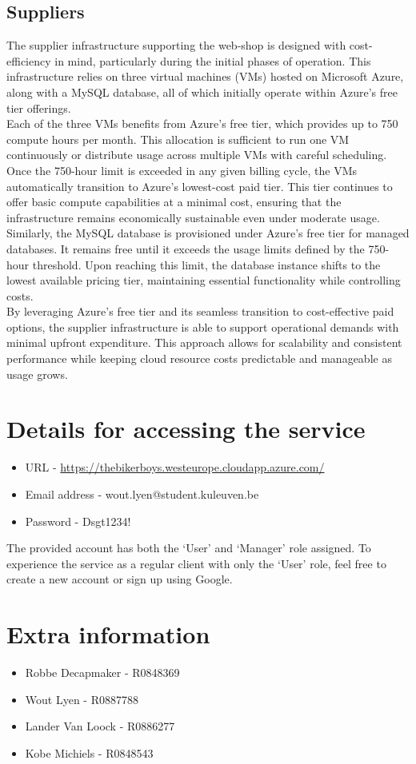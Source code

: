 \documentclass[10pt,a4paper,kul]{kulakarticle} %
\begin{document}
		\subsection{Suppliers}
			The supplier infrastructure supporting the web-shop is designed with cost-efficiency in mind, particularly during the initial phases of operation. This infrastructure relies on three virtual machines (VMs) hosted on Microsoft Azure, along with a MySQL database, all of which initially operate within Azure's free tier offerings.\\
			Each of the three VMs benefits from Azure’s free tier, which provides up to 750 compute hours per month. This allocation is sufficient to run one VM continuously or distribute usage across multiple VMs with careful scheduling. Once the 750-hour limit is exceeded in any given billing cycle, the VMs automatically transition to Azure’s lowest-cost paid tier. This tier continues to offer basic compute capabilities at a minimal cost, ensuring that the infrastructure remains economically sustainable even under moderate usage.\\
			Similarly, the MySQL database is provisioned under Azure’s free tier for managed databases. It remains free until it exceeds the usage limits defined by the 750-hour threshold. Upon reaching this limit, the database instance shifts to the lowest available pricing tier, maintaining essential functionality while controlling costs.\\
			By leveraging Azure’s free tier and its seamless transition to cost-effective paid options, the supplier infrastructure is able to support operational demands with minimal upfront expenditure. This approach allows for scalability and consistent performance while keeping cloud resource costs predictable and manageable as usage grows.
			
	\section{Details for accessing the service}
	
	\begin{itemize}
		\item URL - \url{https://thebikerboys.westeurope.cloudapp.azure.com/}
		\item Email address - wout.lyen@student.kuleuven.be
		\item Password - Dsgt1234!
	\end{itemize}
	
	\noindent The provided account has both the `User' and `Manager' role assigned. To experience the service as a regular client with only the `User' role, feel free to create a new account or sign up using Google.
	
\newpage
  \section{Extra information}
  \begin{itemize}
    \item Robbe Decapmaker - R0848369
    \item Wout Lyen - R0887788
    \item Lander Van Loock - R0886277
    \item Kobe Michiels - R0848543
  \end{itemize}
  
\end{document}
